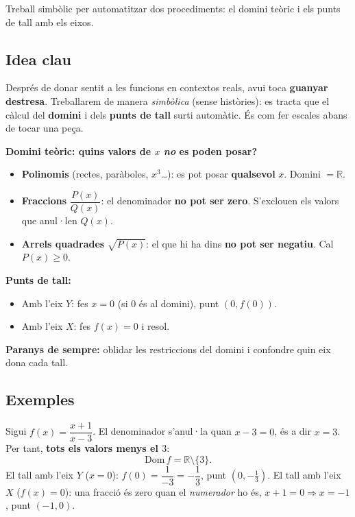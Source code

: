 %
{Treball simbòlic per automatitzar dos procediments: el domini teòric i els punts de tall amb els eixos.}

\subsection{Idea clau}

Després de donar sentit a les funcions en contextos reals, avui toca
\textbf{guanyar destresa}. Treballarem de manera \emph{simbòlica} (sense
històries): es tracta que el càlcul del \textbf{domini} i dels \textbf{punts de
tall} surti automàtic. És com fer escales abans de tocar una peça.

\begin{idea}
\textbf{Domini teòric: quins valors de $x$ \emph{no} es poden posar?}
\begin{itemize}[leftmargin=1.4em, itemsep=2pt]
  \item \textbf{Polinomis} (rectes, paràboles, $x^3$\dots): es pot posar
        \textbf{qualsevol} $x$. Domini $=\mathbb{R}$.
  \item \textbf{Fraccions} $\dfrac{P(x)}{Q(x)}$: el denominador \textbf{no pot ser
        zero}. S'exclouen els valors que anul·len $Q(x)$.
  \item \textbf{Arrels quadrades} $\sqrt{P(x)}$: el que hi ha dins \textbf{no pot ser
        negatiu}. Cal $P(x)\ge 0$.
\end{itemize}
\textbf{Punts de tall:}
\begin{itemize}[leftmargin=1.4em, itemsep=2pt]
  \item Amb l'eix $Y$: fes $x=0$ (si $0$ és al domini), punt $(0,f(0))$.
  \item Amb l'eix $X$: fes $f(x)=0$ i resol.
\end{itemize}
\textbf{Paranys de sempre:} oblidar les restriccions del domini i confondre quin eix
dona cada tall.
\end{idea}

\subsection{Exemples}

\begin{exemple}
Sigui $f(x)=\dfrac{x+1}{x-3}$. El denominador s'anul·la quan $x-3=0$, és a dir
$x=3$. Per tant, \textbf{tots els valors menys el $3$}:
\[
\mathrm{Dom}\,f=\mathbb{R}\setminus\{3\}.
\]
El tall amb l'eix $Y$ ($x=0$): $f(0)=\dfrac{1}{-3}=-\dfrac{1}{3}$, punt
$\left(0,-\tfrac{1}{3}\right)$. El tall amb l'eix $X$ ($f(x)=0$): una fracció és
zero quan el \emph{numerador} ho és, $x+1=0 \Rightarrow x=-1$, punt $(-1,0)$.
\end{exemple}

